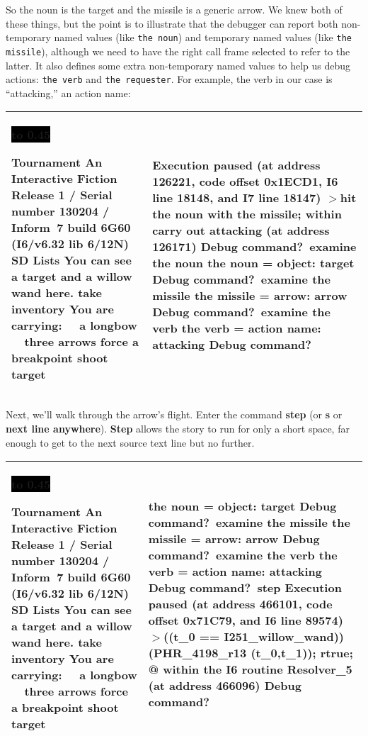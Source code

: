 \documentclass{book}
\newcommand{\n}{\hspace*{\fill}\newline}
\newcommand{\terp}[2]{\begin{center}\begin{tabular}{p{0.45\textwidth}|p{0.45\textwidth}}\midrule #1&#2\\\midrule\end{tabular}\end{center}}
\newcommand{\glkheading}[1]{\textbf{#1}}
\newcommand{\glkinput}[1]{\textbf{#1}}
\newcommand{\glkstatusline}[2]{\centerline{\colorbox{black}{\hbox to 0.45\textwidth{\textcolor{white}{#1\hfil #2}}}}}
\newcommand{\storyprompt}{\raisebox{1.5pt}{\(>\)}}
\newcommand{\cursor}{\raisebox{-1.5pt}{\RectangleThin}}
\newcommand{\markedindent}{\(>\)\qquad}
\begin{document}
So the noun is the target and the missile is a generic arrow.  We knew both of
these things, but the point is to illustrate that the debugger can report both
non-temporary named values (like \lstinline{the noun}) and temporary named
values (like \lstinline{the missile}), although we need to have the right call
frame selected to refer to the latter.  It also defines some extra non-temporary
named values to help us debug actions: \lstinline{the verb} and
\lstinline{the requester}.  For example, the verb in our case is ``attacking,''
an action name:

\terp{\glkstatusline{Lists}{0/2}\n
  \glkheading{Tournament}\n
  An Interactive Fiction\n
  Release 1 / Serial number 130204 / Inform~7 build 6G60 (I6/v6.32 lib 6/12N) SD\n
  \n
  \glkheading{Lists}\n
  You can see a target and a willow wand here.\n
  \n
  \storyprompt\glkinput{take inventory}\n
  You are carrying:\n
  \null\ \ a longbow\n
  \null\ \ three arrows\n
  \n
  \storyprompt\glkinput{force a breakpoint}\n
  \storyprompt\glkinput{shoot target}}{%
  Execution paused (at address 126221, code offset 0x1ECD1, I6 line 18148, and I7 line 18147)\n
  \markedindent hit the noun with the missile;\n
  within carry out attacking (at address 126171)\n
  \n
  Debug command?\ \glkinput{examine the noun}\n
  \n
  the noun = object: target\n
  \n
  Debug command?\ \glkinput{examine the missile}\n
  \n
  the missile = arrow: arrow\n
  \n
  Debug command?\ \glkinput{examine the verb}\n
  \n
  the verb = action name: attacking\n
  \n
  Debug command?\ \cursor}

Next, we'll walk through the arrow's flight.  Enter the command \glkinput{step}
(or \glkinput{s} or \glkinput{next line anywhere}).  \glkinput{Step} allows the
story to run for only a short space, far enough to get to the next source text
line but no further.

\terp{\glkstatusline{Lists}{0/2}\n
  \glkheading{Tournament}\n
  An Interactive Fiction\n
  Release 1 / Serial number 130204 / Inform~7 build 6G60 (I6/v6.32 lib 6/12N) SD\n
  \n
  \glkheading{Lists}\n
  You can see a target and a willow wand here.\n
  \n
  \storyprompt\glkinput{take inventory}\n
  You are carrying:\n
  \null\ \ a longbow\n
  \null\ \ three arrows\n
  \n
  \storyprompt\glkinput{force a breakpoint}\n
  \storyprompt\glkinput{shoot target}}{%
  the noun = object: target\n
  \n
  Debug command?\ \glkinput{examine the missile}\n
  \n
  the missile = arrow: arrow\n
  \n
  Debug command?\ \glkinput{examine the verb}\n
  \n
  the verb = action name: attacking\n
  \n
  Debug command?\ \glkinput{step}\n
  \n
  Execution paused (at address 466101, code offset 0x71C79, and I6 line 89574)\n
  \markedindent \lstinline@if ((t\_0 == I251\_willow\_wand)) { (PHR\_4198\_r13 (t\_0,t\_1)); rtrue; }@\n
  within the I6 routine Resolver\_5 (at address 466096)\n
  \n
  Debug command?\ \cursor}
\end{document}
